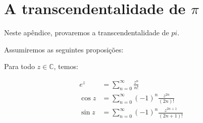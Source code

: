 \chapter[A transcendentalidade de pi]{A transcendentalidade de $\pi$}

Neste apêndice, provaremos a transcendentalidade de $pi$.

Assumiremos as seguintes proposições:
\begin{lemma}
    Para todo $z \in \mathbb C$, temos:

    \begin{align*}
        e^z&=\sum_{n=0}^\infty \frac{z^n}{n!}\\
        \cos z&=\sum_{n=0}^\infty (-1)^n\frac{z^{2n}}{(2n)!}\\
        \sin z&=\sum_{n=0}^\infty (-1)^n\frac{z^{2n+1}}{(2n+1)!}
    \end{align*}
\end{lemma}